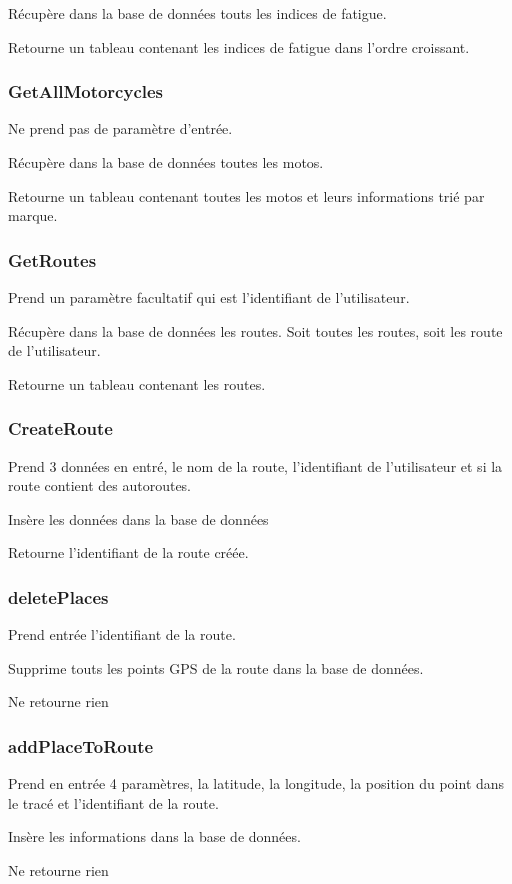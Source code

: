 \documentclass[a4paper]{article}
\begin{document}
Récupère dans la base de données touts les indices de fatigue.

Retourne un tableau contenant les indices de fatigue dans l'ordre croissant.
\subsubsection{GetAllMotorcycles}
Ne prend pas de paramètre d'entrée.

Récupère dans la base de données toutes les motos.

Retourne un tableau contenant toutes les motos et leurs informations trié par marque. 
\subsubsection{GetRoutes}
Prend un paramètre facultatif qui est l'identifiant de l'utilisateur.

Récupère dans la base de données les routes. Soit toutes les routes, soit les route de l'utilisateur.

Retourne un tableau contenant les routes.

\subsubsection{CreateRoute}
Prend 3 données en entré, le nom de la route, l'identifiant de l'utilisateur et si la route contient des autoroutes.

Insère les données dans la base de données

Retourne l'identifiant de la route créée.

\subsubsection{deletePlaces}
Prend entrée l'identifiant de la route.

Supprime touts les points GPS de la route dans la base de données.

Ne retourne rien

\subsubsection{addPlaceToRoute}
Prend en entrée 4 paramètres, la latitude, la longitude, la position du point dans le tracé et l'identifiant de la route.

Insère les informations dans la base de données.

Ne retourne rien
\end{document}
